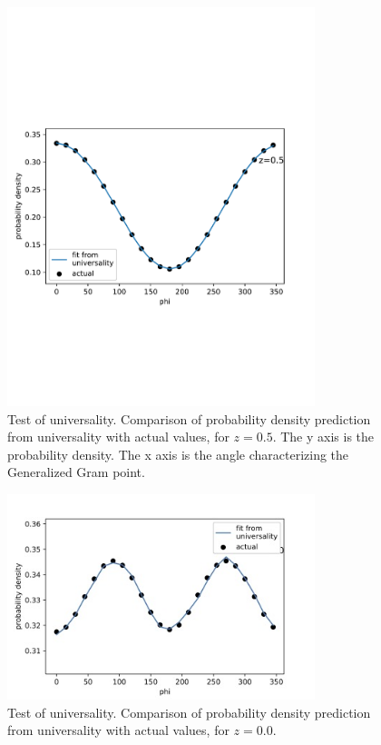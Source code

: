 \documentclass[twoside]{article}
\begin{document}
\begin{figure}
\centering
\includegraphics[width=0.8\textwidth]{z05.pdf}
\caption[]{ 
 Test of universality. Comparison of probability density prediction from
 universality with actual values, for $z=0.5$. The y axis is the probability density.
 The x axis is the angle characterizing the Generalized Gram point.
  }
\vspace{1mm}
\label{z05}
\end{figure}

\begin{figure}
\centering
\includegraphics[width=0.8\textwidth]{z00.jpg}
\caption[]{ 
 Test of universality. Comparison of probability density prediction from
 universality with actual values, for $z=0.0$. 
  }
\vspace{1mm}
\label{z00}
\end{figure}
\end{document}
